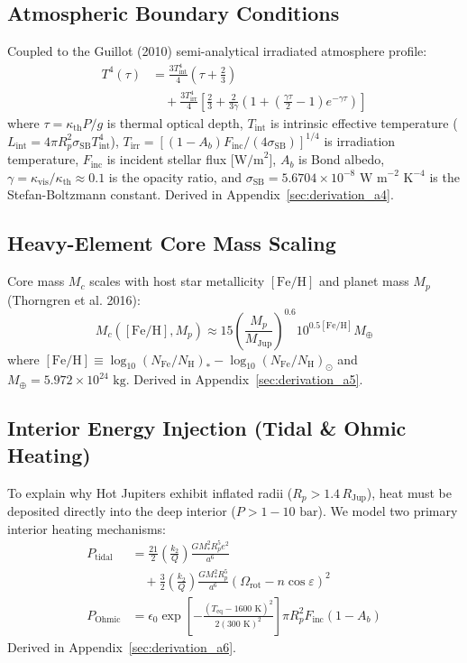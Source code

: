 \subsection{Atmospheric Boundary Conditions}
Coupled to the Guillot (2010) semi-analytical irradiated atmosphere profile:
\begin{align}
T^4(\tau) &= \frac{3 T_{\mathrm{int}}^4}{4}\left(\tau + \frac{2}{3}\right) \nonumber \\
&\quad + \frac{3 T_{\mathrm{irr}}^4}{4}\left[\frac{2}{3} + \frac{2}{3\gamma}\left(1 + \left(\frac{\gamma \tau}{2} - 1\right)e^{-\gamma \tau}\right)\right]
\end{align}
where $\tau = \kappa_{\mathrm{th}} P / g$ is thermal optical depth, $T_{\mathrm{int}}$ is intrinsic effective temperature ($L_{\mathrm{int}} = 4\pi R_p^2 \sigma_{\mathrm{SB}} T_{\mathrm{int}}^4$), $T_{\mathrm{irr}} = [(1-A_b) F_{\mathrm{inc}} / (4 \sigma_{\mathrm{SB}})]^{1/4}$ is irradiation temperature, $F_{\mathrm{inc}}$ is incident stellar flux [$\text{W/m}^2$], $A_b$ is Bond albedo, $\gamma = \kappa_{\mathrm{vis}} / \kappa_{\mathrm{th}} \approx 0.1$ is the opacity ratio, and $\sigma_{\mathrm{SB}} = 5.6704 \times 10^{-8}\text{ W m}^{-2}\text{ K}^{-4}$ is the Stefan-Boltzmann constant. Derived in Appendix~\ref{sec:derivation_a4}.

\subsection{Heavy-Element Core Mass Scaling}
Core mass $M_c$ scales with host star metallicity $[\mathrm{Fe/H}]$ and planet mass $M_p$ (Thorngren et al. 2016):
\begin{equation}
M_c([\mathrm{Fe/H}], M_p) \approx 15 \left(\frac{M_p}{M_{\mathrm{Jup}}}\right)^{0.6} 10^{0.5 [\mathrm{Fe/H}]} M_\oplus
\end{equation}
where $[\mathrm{Fe/H}] \equiv \log_{10}(N_{\mathrm{Fe}}/N_{\mathrm{H}})_* - \log_{10}(N_{\mathrm{Fe}}/N_{\mathrm{H}})_\odot$ and $M_\oplus = 5.972 \times 10^{24}\text{ kg}$. Derived in Appendix~\ref{sec:derivation_a5}.

\subsection{Interior Energy Injection (Tidal \& Ohmic Heating)}
To explain why Hot Jupiters exhibit inflated radii ($R_p > 1.4\,R_{\mathrm{Jup}}$), heat must be deposited directly into the deep interior ($P > 1 - 10\text{ bar}$). We model two primary interior heating mechanisms:
\begin{align}
P_{\mathrm{tidal}} &= \frac{21}{2} \left(\frac{k_2}{Q}\right) \frac{G M_*^2 R_p^5 e^2}{a^6} \nonumber \\
&\quad + \frac{3}{2} \left(\frac{k_2}{Q}\right) \frac{G M_*^2 R_p^5}{a^6} (\Omega_{\mathrm{rot}} - n \cos\varepsilon)^2 \\
P_{\mathrm{Ohmic}} &= \epsilon_0 \exp\left[ -\frac{(T_{\mathrm{eq}} - 1600\text{ K})^2}{2 (300\text{ K})^2} \right] \pi R_p^2 F_{\mathrm{inc}} (1 - A_b)
\end{align}
Derived in Appendix~\ref{sec:derivation_a6}.

